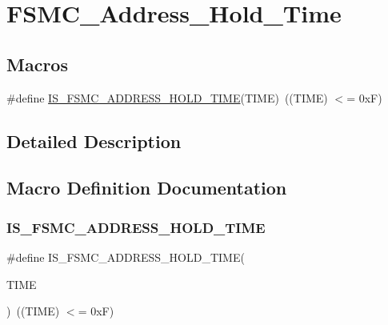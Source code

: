 \hypertarget{group___f_s_m_c___address___hold___time}{}\section{F\+S\+M\+C\+\_\+\+Address\+\_\+\+Hold\+\_\+\+Time}
\label{group___f_s_m_c___address___hold___time}
\subsection*{Macros}
\begin{DoxyCompactItemize}
\item 
\#define \mbox{\hyperlink{group___f_s_m_c___address___hold___time_gae7d031a5b95ad00acf67e9bc95064998}{I\+S\+\_\+\+F\+S\+M\+C\+\_\+\+A\+D\+D\+R\+E\+S\+S\+\_\+\+H\+O\+L\+D\+\_\+\+T\+I\+ME}}(T\+I\+ME)~((T\+I\+ME) $<$= 0x\+F)
\end{DoxyCompactItemize}


\subsection{Detailed Description}


\subsection{Macro Definition Documentation}
\mbox{\label{group___f_s_m_c___address___hold___time_gae7d031a5b95ad00acf67e9bc95064998}} 
\subsubsection{\texorpdfstring{IS\_FSMC\_ADDRESS\_HOLD\_TIME}{IS\_FSMC\_ADDRESS\_HOLD\_TIME}}
{\footnotesize\ttfamily \#define I\+S\+\_\+\+F\+S\+M\+C\+\_\+\+A\+D\+D\+R\+E\+S\+S\+\_\+\+H\+O\+L\+D\+\_\+\+T\+I\+ME(\begin{DoxyParamCaption}\item[{}]{T\+I\+ME }\end{DoxyParamCaption})~((T\+I\+ME) $<$= 0x\+F)}

